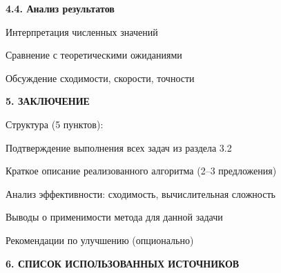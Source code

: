 \documentclass{article}%
\begin{document}
\begin{flushleft}%
\textbf{4.4. Анализ результатов}%
%
\end{flushleft}%
\begin{flushleft}%
Интерпретация численных значений%
%
\end{flushleft}%
\begin{flushleft}%
Сравнение с теоретическими ожиданиями%
%
\end{flushleft}%
\begin{flushleft}%
Обсуждение сходимости, скорости, точности%
%
\end{flushleft}%
\begin{flushleft}%
\textbf{5. ЗАКЛЮЧЕНИЕ}%
%
\end{flushleft}%
\begin{flushleft}%
Структура (5 пунктов):%
%
\end{flushleft}%
\begin{flushleft}%
Подтверждение выполнения всех задач из раздела 3.2%
%
\end{flushleft}%
\begin{flushleft}%
Краткое описание реализованного алгоритма (2–3 предложения)%
%
\end{flushleft}%
\begin{flushleft}%
Анализ эффективности: сходимость, вычислительная сложность%
%
\end{flushleft}%
\begin{flushleft}%
Выводы о применимости метода для данной задачи%
%
\end{flushleft}%
\begin{flushleft}%
Рекомендации по улучшению (опционально)%
%
\end{flushleft}%
\begin{flushleft}%
\textbf{6. СПИСОК ИСПОЛЬЗОВАННЫХ ИСТОЧНИКОВ}%
%
\end{flushleft}%
\end{document}
